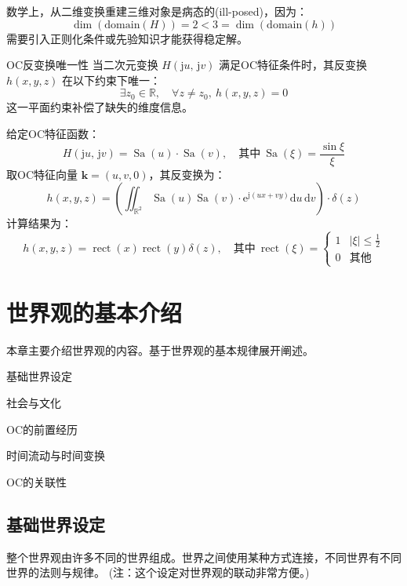 \documentclass[lang=cn,newtx,10pt,scheme=chinese]{elegantbook}
\newcommand{\md}{\mathrm{d}}
\newcommand{\me}{\mathrm{e}}
\newcommand{\mj}{\mathrm{j}}
\begin{document}
\begin{theorem}[信息损失]
    数学上，从二维变换重建三维对象是病态的(ill-posed)，因为：
    \[
        \dim(\text{domain}(H)) = 2 < 3 = \dim(\text{domain}(h))
    \]
    需要引入正则化条件或先验知识才能获得稳定解。
\end{theorem}

\begin{theorem}{OC反变换唯一性}
    当二次元变换 \( H(\mj u,\,\mj v) \) 满足OC特征条件时，其反变换 \( h(x,y,z) \) 在以下约束下唯一：
    \[
        \exists z_0 \in \mathbb{R}, \quad \forall z \neq z_0, \ h(x,y,z) = 0
    \]
    这一平面约束补偿了缺失的维度信息。
\end{theorem}

\begin{example}
    给定OC特征函数：
    \[ H(\mj u,\,\mj v) = \operatorname{Sa}(u) \cdot \operatorname{Sa}(v), \quad \text{其中} \ \operatorname{Sa}(\xi) = \frac{\sin \xi}{\xi} \]
    取OC特征向量 \(\bm{k} = (u, v, 0)\)，其反变换为：
    \[ h(x,y,z) = \left( \iint_{\mathbb{R}^2} \operatorname{Sa}(u) \operatorname{Sa}(v) \cdot \me^{\mj (ux + vy)} \md u\,\md v \right) \cdot \delta(z) \]
    计算结果为：
    \[ h(x,y,z) = \operatorname{rect}(x) \operatorname{rect}(y) \delta(z), \quad \text{其中} \ \operatorname{rect}(\xi) = \begin{cases}
            1 & |\xi| \leq \frac{1}{2} \\
            0 & \text{其他}
        \end{cases} \]
\end{example}

\chapter{世界观的基本介绍}
本章主要介绍世界观的内容。基于世界观的基本规律展开阐述。
\begin{introduction}
    \item 基础世界设定
    \item 社会与文化
    \item OC的前置经历
    \item 时间流动与时间变换
    \item OC的关联性
\end{introduction}

\section{基础世界设定}
整个世界观由许多不同的世界组成。世界之间使用某种方式连接，不同世界有不同世界的法则与规律。
(注：这个设定对世界观的联动非常方便。)
\end{document}
